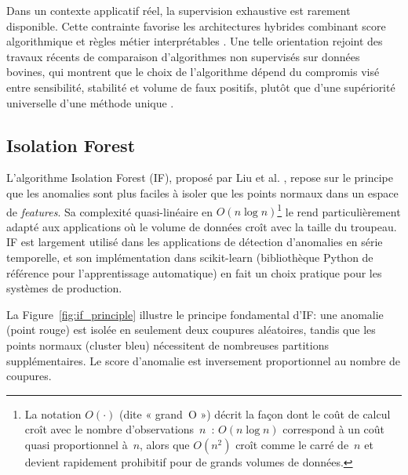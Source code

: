 Dans un contexte applicatif réel, la supervision exhaustive est rarement disponible.
Cette contrainte favorise les architectures hybrides combinant score algorithmique
et règles métier interprétables \citep{chandola2009anomaly,palma2025scoping}. Une telle
orientation rejoint des travaux récents de comparaison d'algorithmes non supervisés sur
données bovines, qui montrent que le choix de l'algorithme dépend du compromis visé entre
sensibilité, stabilité et volume de faux positifs, plutôt que d'une supériorité universelle
d'une méthode unique \citep{michelena2025comparative}.

\subsection{Isolation Forest}
L'algorithme Isolation Forest (IF), proposé par Liu et al. \citep{liu2008isolation}, repose
sur le principe que les anomalies sont plus faciles à isoler que les points normaux dans un
espace de \textit{features}. Sa complexité quasi-linéaire en
$O(n \log n)$\footnote{La notation $O(\cdot)$ (dite « grand~O ») décrit la façon dont le
coût de calcul croît avec le nombre d'observations~$n$~: $O(n \log n)$ correspond à un
coût quasi proportionnel à~$n$, alors que $O(n^2)$ croît comme le carré de~$n$ et devient
rapidement prohibitif pour de grands volumes de données.} le rend particulièrement
adapté aux applications où le volume de données croît avec la taille du troupeau. IF est
largement utilisé dans les applications de détection d'anomalies en série temporelle, et
son implémentation dans scikit-learn (bibliothèque Python de référence pour l'apprentissage
automatique) \citep{sklearn_api} en fait un choix pratique pour les systèmes de production.

La Figure~\ref{fig:if_principle} illustre le principe fondamental d'IF: une anomalie
(point rouge) est isolée en seulement deux coupures aléatoires, tandis que les points
normaux (cluster bleu) nécessitent de nombreuses partitions supplémentaires. Le score
d'anomalie est inversement proportionnel au nombre de coupures.

